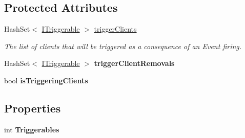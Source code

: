 \subsection*{Protected Attributes}
\begin{DoxyCompactItemize}
\item 
\hypertarget{classstrange_1_1extensions_1_1dispatcher_1_1eventdispatcher_1_1impl_1_1_event_dispatcher_a4a32fe69fc92b7a3ec5609b6aae67cd8}{Hash\-Set$<$ \hyperlink{interfacestrange_1_1extensions_1_1dispatcher_1_1api_1_1_i_triggerable}{I\-Triggerable} $>$ \hyperlink{classstrange_1_1extensions_1_1dispatcher_1_1eventdispatcher_1_1impl_1_1_event_dispatcher_a4a32fe69fc92b7a3ec5609b6aae67cd8}{trigger\-Clients}}\label{classstrange_1_1extensions_1_1dispatcher_1_1eventdispatcher_1_1impl_1_1_event_dispatcher_a4a32fe69fc92b7a3ec5609b6aae67cd8}

\begin{DoxyCompactList}\small\item\em The list of clients that will be triggered as a consequence of an Event firing. \end{DoxyCompactList}\item 
\hypertarget{classstrange_1_1extensions_1_1dispatcher_1_1eventdispatcher_1_1impl_1_1_event_dispatcher_a5dd3b28d7fd2d648506ab903412bf710}{Hash\-Set$<$ \hyperlink{interfacestrange_1_1extensions_1_1dispatcher_1_1api_1_1_i_triggerable}{I\-Triggerable} $>$ {\bfseries trigger\-Client\-Removals}}\label{classstrange_1_1extensions_1_1dispatcher_1_1eventdispatcher_1_1impl_1_1_event_dispatcher_a5dd3b28d7fd2d648506ab903412bf710}

\item 
\hypertarget{classstrange_1_1extensions_1_1dispatcher_1_1eventdispatcher_1_1impl_1_1_event_dispatcher_a9cfbaaf096ecdb2555d62d992a4e6892}{bool {\bfseries is\-Triggering\-Clients}}\label{classstrange_1_1extensions_1_1dispatcher_1_1eventdispatcher_1_1impl_1_1_event_dispatcher_a9cfbaaf096ecdb2555d62d992a4e6892}

\end{DoxyCompactItemize}
\subsection*{Properties}
\begin{DoxyCompactItemize}
\item 
\hypertarget{classstrange_1_1extensions_1_1dispatcher_1_1eventdispatcher_1_1impl_1_1_event_dispatcher_acef4e2aa08821343fd6c516b0b71ed9f}{int {\bfseries Triggerables}}\label{classstrange_1_1extensions_1_1dispatcher_1_1eventdispatcher_1_1impl_1_1_event_dispatcher_acef4e2aa08821343fd6c516b0b71ed9f}

\end{DoxyCompactItemize}


